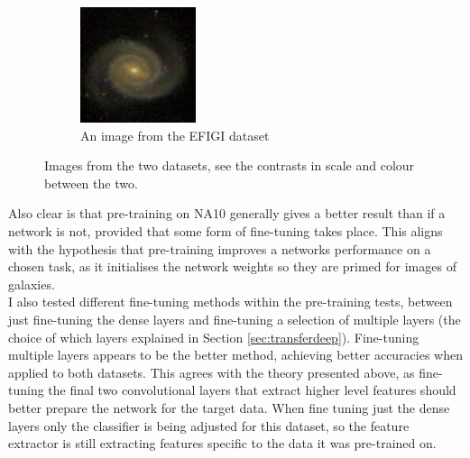 \documentclass[12pt, onecolumn]{aa}
\begin{document}
\begin{figure}[t!]
\begin{subfigure}[t]{0.4\linewidth}
        \includegraphics[width=\linewidth]{Figures/2182.jpg}
        \caption{An image from the EFIGI dataset}
    \end{subfigure}
    \caption{Images from the two datasets, see the contrasts in scale and colour between the two.}
    \label{fig:efigi/na}
\end{figure}

Also clear is that pre-training on NA10 generally gives a better result than if a network is not, provided that some form of fine-tuning takes place. This aligns with the hypothesis that pre-training improves a networks performance on a chosen task, as it initialises the network weights so they are primed for images of galaxies. \\

I also tested different fine-tuning methods within the pre-training tests, between just fine-tuning the dense layers and fine-tuning a selection of multiple layers (the choice of which layers explained in Section \ref{sec:transferdeep}). Fine-tuning multiple layers appears to be the better method, achieving better accuracies when applied to both datasets. This agrees with the theory presented above, as fine-tuning the final two convolutional layers that extract higher level features should better prepare the network for the target data. When fine tuning just the dense layers only the classifier is being adjusted for this dataset, so the feature extractor is still extracting features specific to the data it was pre-trained on. \\
\end{document}
